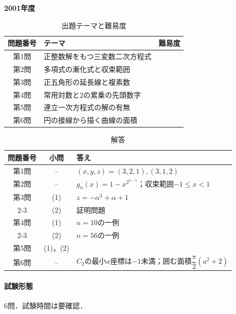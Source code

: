 \documentclass[../../main.tex]{subfiles}
\begin{document}
\begin{center}
  {\fontsize{48pt}{58pt}\selectfont \textbf{2001}\normalsize\textbf{年度}}
\end{center}

\begin{table}[htb]
  \centering
  \caption{出題テーマと難易度}
  \begin{tabular}{|c|p{9cm}|c|}
    \hline
    \textbf{問題番号} & \textbf{テーマ} & \textbf{難易度} \\
    \hline
    第1問 & 正整数解をもつ三変数二次方程式 & \\
    \hline
    第2問 & 多項式の漸化式と収束範囲 & \\
    \hline
    第3問 & 正五角形の延長線と複素数 & \\
    \hline
    第4問 & 常用対数と2の累乗の先頭数字 & \\
    \hline
    第5問 & 連立一次方程式の解の有無 & \\
    \hline
    第6問 & 円の接線から描く曲線の面積 & \\
    \hline
  \end{tabular}
\end{table}

\begin{table}[htb]
  \centering
  \caption{解答}
  \renewcommand{\arraystretch}{1.4}
  \begin{tabular}{|c|c|p{9cm}|}
    \hline
    \textbf{問題番号} & \textbf{小問} & \textbf{答え} \\
    \hline
    第1問 & -- & $(x,y,z)=(3,2,1),(3,1,2)$ \\
    \hline
    第2問 & -- & $g_n(x)=1-x^{2^{n-1}}$；収束範囲$-1\le x<1$ \\
    \hline
    第3問 & (1) & $z=-\alpha^3+\alpha+1$ \\
    \cline{2-3}
    & (2) & 証明問題 \\
    \hline
    第4問 & (1) & $n=10$の一例 \\
    \cline{2-3}
    & (2) & $n=56$の一例 \\
    \hline
    第5問 & (1)，(2) &  \\
    \hline
    第6問 & -- & $C_2$の最小$x$座標は$-1$未満；囲む面積$\dfrac{\pi}{2}(a^2+2)$ \\
    \hline
  \end{tabular}
\end{table}

\paragraph{試験形態}
6問．試験時間は要確認．
\end{document}
